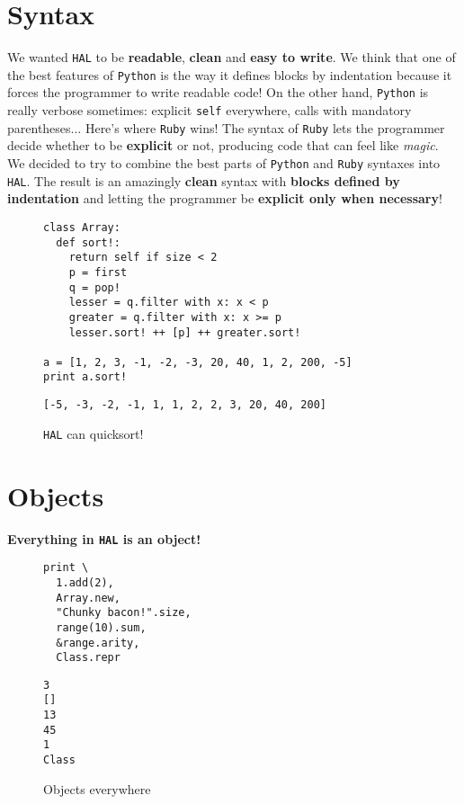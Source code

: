 \documentclass[a4paper,11pt]{article}
\begin{document}
\section{Syntax}
We wanted \texttt{HAL} to be \textbf{readable}, \textbf{clean} and \textbf{easy to write}. We think that one of the
  best features of \texttt{Python} is the way it defines blocks by indentation because it forces the programmer
  to write readable code! On the other hand, \texttt{Python} is really verbose sometimes: explicit \texttt{self} everywhere,
  calls with mandatory parentheses... Here's where \texttt{Ruby} wins! The syntax of \texttt{Ruby} lets the programmer
  decide whether to be \textbf{explicit} or not, producing code that can feel like \emph{magic}.
\\
We decided to try to combine the best parts of \texttt{Python} and \texttt{Ruby} syntaxes into \texttt{HAL}. The result
  is an amazingly \textbf{clean} syntax with \textbf{blocks defined by indentation} and letting the programmer
  be \textbf{explicit only when necessary}!
\begin{figure}[h!]
\begin{lstlisting}[language=hal]
class Array:
  def sort!:
    return self if size < 2
    p = first
    q = pop!
    lesser = q.filter with x: x < p
    greater = q.filter with x: x >= p
    lesser.sort! ++ [p] ++ greater.sort!

a = [1, 2, 3, -1, -2, -3, 20, 40, 1, 2, 200, -5]
print a.sort!
\end{lstlisting}
\begin{lstlisting}[language=output]
[-5, -3, -2, -1, 1, 1, 2, 2, 3, 20, 40, 200]
\end{lstlisting}
\caption{\texttt{HAL} can quicksort!}
\end{figure}
\clearpage
\section{Objects}
\textbf{Everything in \texttt{HAL} is an object!}
\begin{figure}[h!]
\begin{lstlisting}[language=hal]
print \
  1.add(2),
  Array.new,
  "Chunky bacon!".size,
  range(10).sum,
  &range.arity,
  Class.repr
\end{lstlisting}
\begin{lstlisting}[language=output]
3
[]
13
45
1
Class
\end{lstlisting}
\caption{Objects everywhere}
\end{figure}
\end{document}
